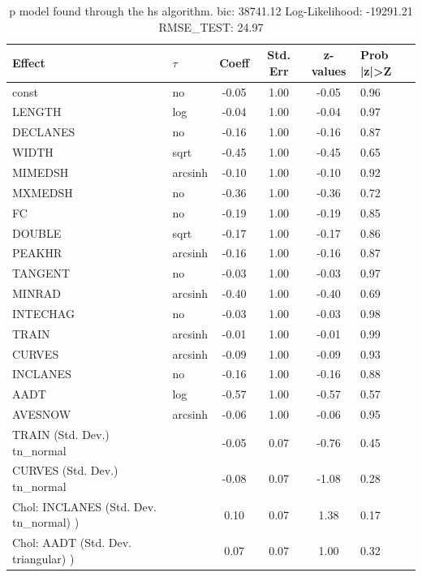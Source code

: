 \begin{table}
	\caption{p model found through the hs algorithm. bic: 38741.12 Log-Likelihood: -19291.21 RMSE_TEST: 24.97}
	\begin{center}
		\begin{tabular}{|l|l|c|c|c|l|}
			\hline
			Effect & $\tau$ & Coeff & Std. Err & z-values & Prob |z|>Z \\
			\hline
			const & no & -0.05 & 1.00 & -0.05 & 0.96 \\
			\hline
			LENGTH & log & -0.04 & 1.00 & -0.04 & 0.97 \\
			\hline
			DECLANES & no & -0.16 & 1.00 & -0.16 & 0.87 \\
			\hline
			WIDTH & sqrt & -0.45 & 1.00 & -0.45 & 0.65 \\
			\hline
			MIMEDSH & arcsinh & -0.10 & 1.00 & -0.10 & 0.92 \\
			\hline
			MXMEDSH & no & -0.36 & 1.00 & -0.36 & 0.72 \\
			\hline
			FC & no & -0.19 & 1.00 & -0.19 & 0.85 \\
			\hline
			DOUBLE & sqrt & -0.17 & 1.00 & -0.17 & 0.86 \\
			\hline
			PEAKHR & arcsinh & -0.16 & 1.00 & -0.16 & 0.87 \\
			\hline
			TANGENT & no & -0.03 & 1.00 & -0.03 & 0.97 \\
			\hline
			MINRAD & arcsinh & -0.40 & 1.00 & -0.40 & 0.69 \\
			\hline
			INTECHAG & no & -0.03 & 1.00 & -0.03 & 0.98 \\
			\hline
			TRAIN & arcsinh & -0.01 & 1.00 & -0.01 & 0.99 \\
			\hline
			CURVES & arcsinh & -0.09 & 1.00 & -0.09 & 0.93 \\
			\hline
			INCLANES & no & -0.16 & 1.00 & -0.16 & 0.88 \\
			\hline
			AADT & log & -0.57 & 1.00 & -0.57 & 0.57 \\
			\hline
			AVESNOW & arcsinh & -0.06 & 1.00 & -0.06 & 0.95 \\
			\hline
			TRAIN (Std. Dev.) tn_normal &  & -0.05 & 0.07 & -0.76 & 0.45 \\
			\hline
			CURVES (Std. Dev.) tn_normal &  & -0.08 & 0.07 & -1.08 & 0.28 \\
			\hline
			 Chol: INCLANES (Std. Dev. tn_normal) ) &  & 0.10 & 0.07 & 1.38 & 0.17 \\
			\hline
			 Chol: AADT (Std. Dev. triangular) ) &  & 0.07 & 0.07 & 1.00 & 0.32 \\
			\hline

\end{tabular}
\end{center}
\end{table}

